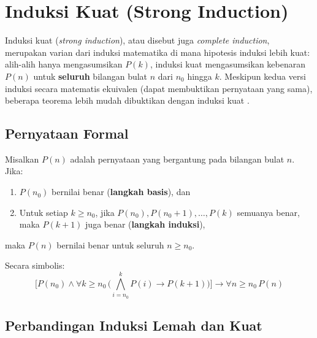 \section{Induksi Kuat (Strong Induction)}

Induksi kuat (\textit{strong induction}), atau disebut juga \textit{complete induction}, merupakan varian dari induksi matematika di mana hipotesis induksi lebih kuat: alih-alih hanya mengasumsikan $P(k)$, induksi kuat mengasumsikan kebenaran $P(n)$ untuk \textbf{seluruh} bilangan bulat $n$ dari $n_0$ hingga $k$. Meskipun kedua versi induksi secara matematis ekuivalen (dapat membuktikan pernyataan yang sama), beberapa teorema lebih mudah dibuktikan dengan induksi kuat \cite{rosen2019}.

\subsection{Pernyataan Formal}

\begin{definisi}
Misalkan $P(n)$ adalah pernyataan yang bergantung pada bilangan bulat $n$. Jika:
\begin{enumerate}
    \item $P(n_0)$ bernilai benar (\textbf{langkah basis}), dan
    \item Untuk setiap $k \geq n_0$, jika $P(n_0), P(n_0+1), \ldots, P(k)$ semuanya benar, maka $P(k+1)$ juga benar (\textbf{langkah induksi}),
\end{enumerate}
maka $P(n)$ bernilai benar untuk seluruh $n \geq n_0$.
\end{definisi}

Secara simbolis:
\[ \Big[ P(n_0) \wedge \forall k \geq n_0\, \Big(\bigwedge_{i=n_0}^{k} P(i) \rightarrow P(k+1)\Big) \Big] \rightarrow \forall n \geq n_0\, P(n) \]

\subsection{Perbandingan Induksi Lemah dan Kuat}

